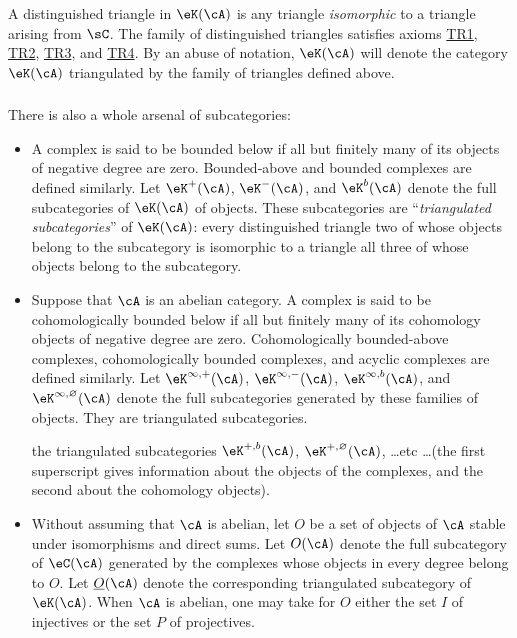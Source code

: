 A distinguished triangle in $\eK(\cA)$ is any triangle \emph{isomorphic}
to a triangle arising from $\sC$. The family of distinguished triangles
satisfies axioms \hyperlink{VIII:TR1}{TR1},
\hyperlink{VIII:TR2}{TR2}, \hyperlink{VIII:TR3}{TR3}, and
\hyperlink{VIII:TR4}{TR4}. By an abuse of notation, $\eK(\cA)$ will denote
the category $\eK(\cA)$ triangulated by the family of triangles defined
above.

\subsubsection{}\label{VIII:1-2-3}

There is also a whole arsenal of subcategories:
\begin{itemize}
  \item A complex is said to be bounded below if all but finitely many of
    its objects of negative degree are zero. Bounded-above and bounded
    complexes are defined similarly. Let $\eK^+(\cA)$, $\eK^-(\cA)$,
    and $\eK^b(\cA)$ denote the full subcategories of $\eK(\cA)$  of objects. These subcategories are
    “\emph{triangulated subcategories}” of $\eK(\cA)$: every distinguished
    triangle two of whose objects belong to the subcategory is isomorphic
    to a triangle all three of whose objects belong to the subcategory.
  \item Suppose that $\cA$ is an abelian category. A complex is said to be
    cohomologically bounded below if all but finitely many of its
    cohomology objects of negative degree are zero. Cohomologically
    bounded-above complexes, cohomologically bounded complexes, and
    acyclic complexes are defined similarly. Let
    $\eK^{\infty,+}(\cA)$, $\eK^{\infty,-}(\cA)$,
    $\eK^{\infty,b}(\cA)$, and $\eK^{\infty,\varnothing}(\cA)$ denote the
    full subcategories generated by these families of objects. They are
    triangulated subcategories.

     the triangulated subcategories $\eK^{+,b}(\cA)$,
    $\eK^{+,\varnothing}(\cA)$, \ldots etc \ldots (the first superscript
    gives information about the objects of the complexes, and the second
    about the cohomology objects).
  \item Without assuming that $\cA$ is abelian, let $O$ be a set of objects
    of $\cA$ stable under isomorphisms and direct sums. Let $O(\cA)$ denote
    the full subcategory of $\eC(\cA)$ generated by the complexes whose
    objects in every degree belong to $O$. Let $\underline O(\cA)$ denote
    the corresponding triangulated subcategory of $\eK(\cA)$. When $\cA$
    is abelian, one may take for $O$ either the set $I$ of injectives or
    the set $P$ of projectives.
\end{itemize}

